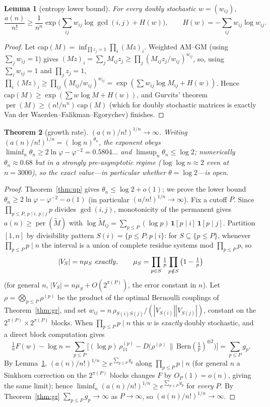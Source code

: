 \documentclass[11pt]{article}
\newtheorem{theorem}{Theorem}
\newtheorem{lemma}[theorem]{Lemma}
\theoremstyle{remark}\newtheorem{remark}[theorem]{Remark}
\DeclareMathOperator{\perm}{per}
\begin{document}
\begin{lemma}[entropy lower bound]\label{lem:ent}
For every doubly stochastic $w=(w_{ij})$,
\[
\frac{a(n)}{n!}\ge \frac{1}{n^n}\exp\!\Big(\sum_{ij}w_{ij}\log\gcd(i,j)+H(w)\Big),
\qquad H(w)=-\sum_{ij}w_{ij}\log w_{ij}.
\]
\end{lemma}
\begin{proof}
Let $\mathrm{cap}(M)=\inf_{\prod z_j=1}\prod_i(Mz)_i$. Weighted AM--GM (using
$\sum_j w_{ij}=1$) gives $(Mz)_i=\sum_j M_{ij}z_j\ge\prod_j (M_{ij}z_j/w_{ij})
^{w_{ij}}$, so, using $\sum_i w_{ij}=1$ and $\prod_j z_j=1$,
$\prod_i(Mz)_i\ge\prod_{ij}(M_{ij}/w_{ij})^{w_{ij}}=\exp(\sum w_{ij}\log M_{ij}
+H(w))$. Hence $\mathrm{cap}(M)\ge\exp(\sum w\log M+H(w))$, and Gurvits'
theorem $\perm(M)\ge(n!/n^n)\,\mathrm{cap}(M)$ (which for doubly stochastic
matrices is exactly Van der Waerden--Falikman--Egorychev) finishes.
\end{proof}

\begin{theorem}[growth rate]\label{thm:c}
$(a(n)/n!)^{1/n}\to\infty$. Writing $(a(n)/n!)^{1/n}=(\log n)^{\theta_n}$, the
exponent obeys $\liminf_n\theta_n\ge2\ln\varphi-\varphi^{-2}=0.5804\ldots$ and
$\limsup_n\theta_n\le\log2$; numerically $\theta_n\approx0.68$ but in a strongly
pre-asymptotic regime ($\log\log n\approx2$ even at $n=3000$), so the exact
value---in particular whether $\theta=\log2$---is open.
\end{theorem}
\begin{proof}
Theorem~\ref{thm:up} gives $\theta_n\le\log2+o(1)$; we prove the lower bound
$\theta_n\ge2\ln\varphi-\varphi^{-2}-o(1)$ (in particular $(a/n!)^{1/n}\to
\infty$). Fix a cutoff $P$. Since
$\prod_{p\le P,\,p\mid i,\,p\mid j}p$ divides $\gcd(i,j)$, monotonicity of the
permanent gives $a(n)\ge\perm(\tilde M)$ with
$\log\tilde M_{ij}=\sum_{p\le P}(\log p)\,\mathbf1[p\mid i]\,\mathbf1[p\mid j]$.
Partition $[1,n]$ by divisibility pattern $S(i)=\{p\le P:p\mid i\}$: for
$S\subseteq\{p\le P\}$, whenever $\prod_{p\le P}p\mid n$ the interval is a union
of complete residue systems mod $\prod_{p\le P}p$, so
\[
 |V_S|=n\mu_S\ \text{\emph{exactly}},\qquad
 \mu_S=\prod_{p\in S}\tfrac1p\prod_{p\notin S}\big(1-\tfrac1p\big)
\]
(for general $n$, $|V_S|=n\mu_S+O(2^{\pi(P)})$, the error constant in $n$). Let
$\rho=\bigotimes_{p\le P}\rho^{(p)}$ be the product of the optimal Bernoulli
couplings of Theorem~\ref{thm:gr}, and set
$w_{ij}=n\,\rho_{S(i)S(j)}/(|V_{S(i)}||V_{S(j)}|)$, constant on the
$2^{\pi(P)}\times2^{\pi(P)}$ blocks. When $\prod_{p\le P}p\mid n$ this $w$ is
\emph{exactly} doubly stochastic, and a direct block computation gives
\[
 \tfrac1nF(w)-\log n=\sum_{p\le P}\Big[(\log p)\,\rho^{(p)}_{11}
 -D\big(\rho^{(p)}\,\|\,\mathrm{Bern}(\tfrac1p)^{\otimes2}\big)\Big]
 =\sum_{p\le P}g_p .
\]
By Lemma~\ref{lem:ent}, $(a(n)/n!)^{1/n}\ge e^{\sum_{p\le P}g_p}$ along
$\prod_{p\le P}p\mid n$ (for general $n$ a Sinkhorn correction on the
$2^{\pi(P)}$ blocks changes $F$ by $O_P(1)=o(n)$, giving the same limit); hence
$\liminf_n(a(n)/n!)^{1/n}\ge e^{\sum_{p\le P}g_p}$ for \emph{every} $P$. By
Theorem~\ref{thm:gr} $\sum_{p\le P}g_p\to\infty$ as $P\to\infty$, so
$(a(n)/n!)^{1/n}\to\infty$.
\end{proof}
\end{document}
